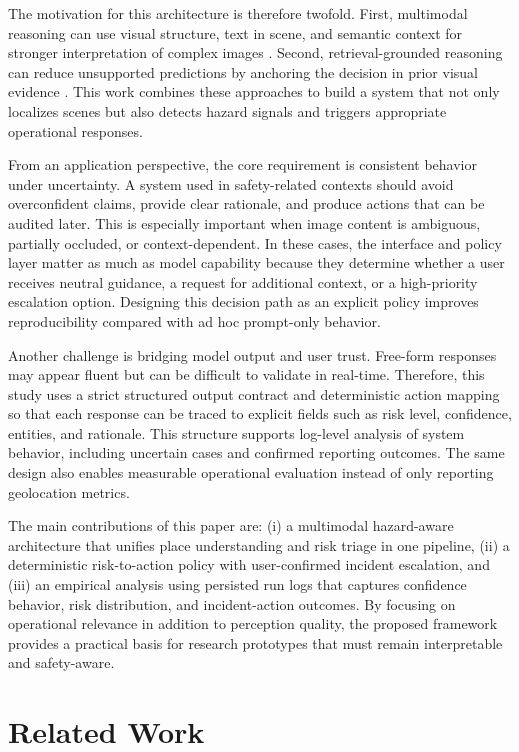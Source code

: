 \documentclass[10pt,conference]{IEEEtran}
\begin{document}
The motivation for this architecture is therefore twofold. First, multimodal reasoning can use visual structure, text in scene, and semantic context for stronger interpretation of complex images \cite{sinski2024improving, radford2021clip}. Second, retrieval-grounded reasoning can reduce unsupported predictions by anchoring the decision in prior visual evidence \cite{li2025pixels, zhou2024img2loc}. This work combines these approaches to build a system that not only localizes scenes but also detects hazard signals and triggers appropriate operational responses.

From an application perspective, the core requirement is consistent behavior under uncertainty. A system used in safety-related contexts should avoid overconfident claims, provide clear rationale, and produce actions that can be audited later. This is especially important when image content is ambiguous, partially occluded, or context-dependent. In these cases, the interface and policy layer matter as much as model capability because they determine whether a user receives neutral guidance, a request for additional context, or a high-priority escalation option. Designing this decision path as an explicit policy improves reproducibility compared with ad hoc prompt-only behavior.

Another challenge is bridging model output and user trust. Free-form responses may appear fluent but can be difficult to validate in real-time. Therefore, this study uses a strict structured output contract and deterministic action mapping so that each response can be traced to explicit fields such as risk level, confidence, entities, and rationale. This structure supports log-level analysis of system behavior, including uncertain cases and confirmed reporting outcomes. The same design also enables measurable operational evaluation instead of only reporting geolocation metrics.

The main contributions of this paper are: (i) a multimodal hazard-aware architecture that unifies place understanding and risk triage in one pipeline, (ii) a deterministic risk-to-action policy with user-confirmed incident escalation, and (iii) an empirical analysis using persisted run logs that captures confidence behavior, risk distribution, and incident-action outcomes. By focusing on operational relevance in addition to perception quality, the proposed framework provides a practical basis for research prototypes that must remain interpretable and safety-aware.

\section{Related Work}
\end{document}
